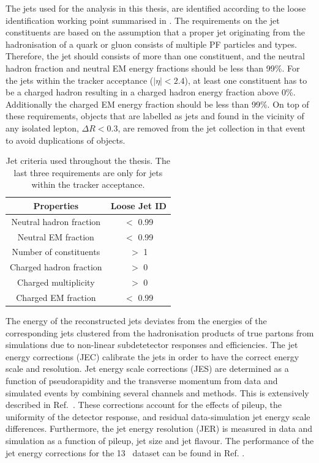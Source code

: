 The jets used for the analysis  in this thesis, are identified according to the loose identification working point summarised in . The requirements on the jet constituents are based on the assumption that a proper jet originating from the hadronisation of a quark or gluon consists of multiple PF particles and types. Therefore, the jet should consists of more than one constituent, and the neutral hadron fraction and neutral EM energy fractions should be less than 99\%. For the jets within the tracker acceptance ($|\eta|<2.4$), at least one constituent has to be a charged hadron resulting in a charged hadron energy fraction above 0\%. Additionally the charged EM energy fraction should be less than 99\%. On top of these requirements, objects that are labelled as jets and found in the vicinity of any isolated lepton, $\Delta R < 0.3$, are removed from the jet collection in that event to avoid duplications of objects. 
\begin{table}[h]
	\centering
	\caption{Jet criteria used throughout the thesis. The last three requirements are only for jets within the tracker acceptance.}
	\begin{tabular}{cc}
		\toprule 
		Properties & Loose Jet ID \\ 
		\midrule
		Neutral hadron fraction & $<$ 0.99 \\ 
		
		Neutral EM fraction & $<$ 0.99 \\ 
		
		Number of constituents & $>$ 1 \\ 
		 		
		Charged hadron fraction & $>$ 0 \\ 
	 
		Charged multiplicity & $>$ 0 \\ 
		
		Charged EM fraction & $<$ 0.99 \\ 
		\bottomrule
	\end{tabular} 
	\label{tab:jetID}
\end{table}

The energy of the reconstructed jets deviates from the energies of the corresponding jets clustered from the hadronisation products of true partons from simulations due to non-linear subdetetector responses and efficiencies. The jet energy corrections (JEC) calibrate the jets in order to have the correct energy scale and resolution.
Jet energy scale corrections (JES) are determined as a function of pseudorapidity and the transverse momentum from data and simulated events by combining several channels and methods. This is extensively described in Ref.~\cite{1748-0221-12-02-P02014}. These corrections account for the effects of pileup, the uniformity of the detector response, and residual data-simulation jet energy scale differences. Furthermore, the jet energy resolution (JER) is measured in data and simulation as a function of pileup, jet size and jet flavour.  %
 The performance of the jet energy corrections for the 13 \TeV\ dataset can be found in Ref. \cite{CMS-DP-2016-020}.


